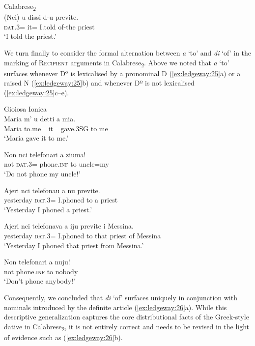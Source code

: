 \documentclass[output=paper,modfonts,nonflat,colorlinks,citecolor=brown]{langsci/langscibook}
\begin{document}
\ex Calabrese\textsubscript{2}\\
    \gll (Nci)  u  dissi  d-u  previte.\\
    \textsc{dat}.3=  it=  I.told  of-the  priest\\
    \glt `I told the priest.'
    \z
    \z

We turn finally to consider the formal alternation between \textit{a} ‘to’ and \textit{di} ‘of’ in the marking of \textsc{Recipient} arguments in Calabrese\textsubscript{2}. Above we noted that \textit{a} ‘to’ surfaces whenever Dº is lexicalised by a pronominal D (\ref{ex:ledgeway:25}a) or a raised N (\ref{ex:ledgeway:25}b) and whenever Dº is not lexicalised (\ref{ex:ledgeway:25}c--e).

\ea\label{ex:ledgeway:25}
  Gioiosa Ionica\\
\ea
	\gll Maria  m’  u  detti  a  mia.\\
    Maria  to.me=  it=  gave.3SG   to  me\\
    \glt `Maria gave it to me.'

\ex
	\gll Non  nci  telefonari  a  ziuma!\\
      not  \textsc{dat}.3=  phone.\textsc{inf}   to  uncle=my\\
      \glt `Do not phone my uncle!'

\ex
	\gll Ajeri  nci  telefonau  a   nu   previte.\\
      yesterday  \textsc{dat}.3=  I.phoned    to   a    priest \\
      \glt `Yesterday I phoned a priest.'

\ex
	\gll Ajeri  nci   telefonava  a  iju    previte   i   Messina.\\
      yesterday  \textsc{dat}.3=  I.phoned  to  that   priest   of   Messina\\
      \glt `Yesterday I phoned that priest from Messina.'

\ex
	\gll Non  telefonari  a  nuju!\\
    not  phone.\textsc{inf}   to  nobody\\
    \glt `Don’t phone anybody!'
    \z
    \z

Consequently, we concluded that \textit{di} ‘of’ surfaces uniquely in conjunction with nominals introduced by the definite article (\ref{ex:ledgeway:26}a). While this descriptive generalization captures the core distributional facts of the Greek-style dative in Calabrese\textsubscript{2}, it is not entirely correct and needs to be revised in the light of evidence such as (\ref{ex:ledgeway:26}b).
\end{document}
